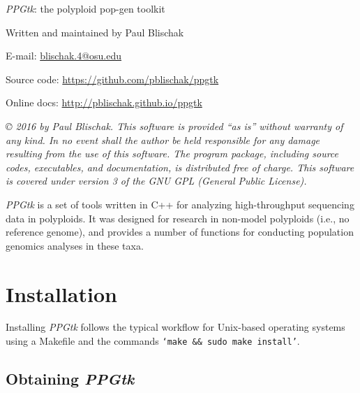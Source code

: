 \documentclass[11pt,english,letterpaper,oneside]{article}
\newcommand{\ppgtk}{\textit{PPGtk}}
\begin{document}
\pagestyle{empty}

\vspace*{1.5in}
\begin{center}

	{\huge \ppgtk: the polyploid pop-gen toolkit}
	\vspace{0.5in}
	
	Written and maintained by Paul Blischak
	
	E-mail: \href{mailto:blischak.4@osu.edu}{blischak.4@osu.edu}
	
	Source code: \url{https://github.com/pblischak/ppgtk}
	
	Online docs: \url{http://pblischak.github.io/ppgtk}
	
\end{center}

\vspace{4in}

{\small \textit{\copyright{} 2016 by Paul Blischak. This software is provided ``as is'' without warranty of any kind. In no event shall the author be held responsible for any damage resulting from the use of this software. The program package, including source codes, executables, and documentation, is distributed free of charge. This software is covered under version 3 of the GNU GPL (General Public License).}}

\newpage

\tableofcontents

\newpage

\clearpage
\pagestyle{plain}
\setcounter{page}{1}

\ppgtk{} is a set of tools written in C++ for analyzing high-throughput sequencing data in polyploids. It was designed for research in non-model polyploids (i.e., no reference genome), and provides a number of functions for conducting population genomics analyses in these taxa.

\section{Installation}

Installing \ppgtk{} follows the typical workflow for Unix-based operating systems using a Makefile and the commands \texttt{`make \&\& sudo make install'}. 

\subsection{Obtaining \ppgtk}
\end{document}
